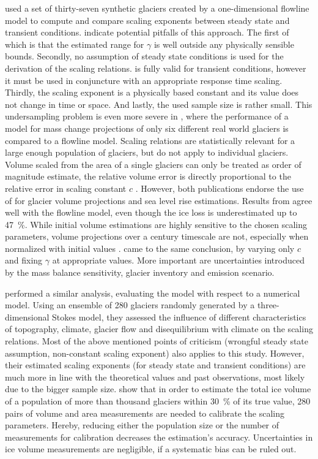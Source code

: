     \citet{Radic2007} used a set of thirty-seven synthetic glaciers created by a one-dimensional flowline model to compute and compare scaling exponents between steady state and transient conditions. \citet{Bahr2015} indicate potential pitfalls of this approach. The first of which is that the estimated range for $\gamma$ is well outside any physically sensible bounds. Secondly, no assumption of steady state conditions is used for the derivation of the scaling relations. \Vas{} is fully valid for transient conditions, however it must be used in conjuncture with an appropriate response time scaling. Thirdly, the scaling exponent is a physically based constant and its value does not change in time or space. And lastly, the used sample size is rather small. This undersampling problem is even more severe in \citet{Radic2008}, where the performance of a \vas{} model for mass change projections of only six different real world glaciers is compared to a flowline model. Scaling relations are statistically relevant for a large enough population of glaciers, but do not apply to individual glaciers. Volume scaled from the area of a single glaciers can only be treated as order of magnitude estimate, the relative volume error is directly proportional to the relative error in scaling constant $c$ \citep{Bahr2015}. However, both publications endorse the use of \vas{} for glacier volume projections and sea level rise estimations. Results from \vas{} agree well with the flowline model, even though the ice loss is underestimated up to \SI{47}{\percent}. While initial volume estimations are highly sensitive to the chosen scaling parameters, volume projections over a century timescale are not, especially when normalized with initial values \citep{Radic2007, Radic2008}. \citet{Slangen2011} came to the same conclusion, by varying only $c$ and fixing $\gamma$ at appropriate values. More important are uncertainties introduced by the mass balance sensitivity, glacier inventory and emission scenario.

    \citet{Adhikari2012} performed a similar analysis, evaluating the \vas{} model with respect to a numerical model. Using an ensemble of 280 glaciers randomly generated by a three-dimensional Stokes model, they assessed the influence of different characteristics of topography, climate, glacier flow and disequilibrium with climate on the scaling relations. Most of the above mentioned points of criticism (wrongful steady state assumption, non-constant scaling exponent) also applies to this study. However, their estimated scaling exponents (for steady state and transient conditions) are much more in line with the theoretical values and past observations, most likely due to the bigger sample size. \citet{Farinotti2013} show that in order to estimate the total ice volume of a population of more than thousand glaciers within \SI{30}{\percent} of its true value, 280 pairs of volume and area measurements are needed to calibrate the scaling parameters. Hereby, reducing either the population size or the number of measurements for calibration decreases the estimation's accuracy. Uncertainties in ice volume measurements are negligible, if a systematic bias can be ruled out.

